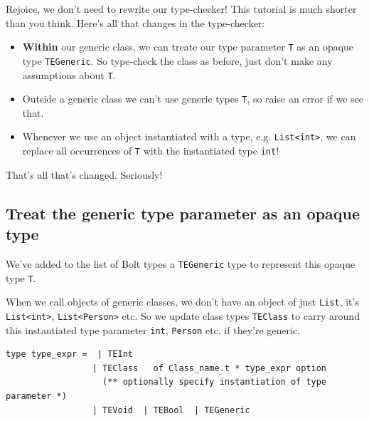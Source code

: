 Rejoice, we don't need to rewrite our type-checker! This tutorial is
much shorter than you think. Here's all that changes in the
type-checker:

\begin{itemize}
\item
  \textbf{Within} our generic class, we can treate our type parameter
  \texttt{T} as an opaque type \texttt{TEGeneric}. So type-check the
  class as before, just don't make any assumptions about \texttt{T}.
\item
  Outside a generic class we can't use generic types \texttt{T}, so
  raise an error if we see that.
\item
  Whenever we use an object instantiated with a type, e.g.
  \texttt{List\textless{}int\textgreater{}}, we can replace all
  occurrences of \texttt{T} with the instantiated type \texttt{int}!
\end{itemize}

That's all that's changed. Seriously!

\hypertarget{treat-the-generic-type-parameter-as-an-opaque-type}{%
\subsection{\texorpdfstring{\protect\hyperlink{treat-the-generic-type-parameter-as-an-opaque-type}{}Treat
the generic type parameter as an opaque
type}{Treat the generic type parameter as an opaque type}}\label{treat-the-generic-type-parameter-as-an-opaque-type}}

We've added to the list of Bolt types a \texttt{TEGeneric} type to
represent this opaque type \texttt{T}.

When we call objects of generic classes, we don't have an object of just
\texttt{List}, it's \texttt{List\textless{}int\textgreater{}},
\texttt{List\textless{}Person\textgreater{}} etc. So we update class
types \texttt{TEClass} to carry around this instantiated type parameter
\texttt{int}, \texttt{Person} etc. if they're generic.
%
%

\begin{lstlisting}[language=caml,caption={ast\_types.ml}]
type type_expr =  | TEInt  
                 | TEClass   of Class_name.t * type_expr option  
                   (** optionally specify instantiation of type parameter *)  
                 | TEVoid  | TEBool  | TEGeneric
\end{lstlisting}

